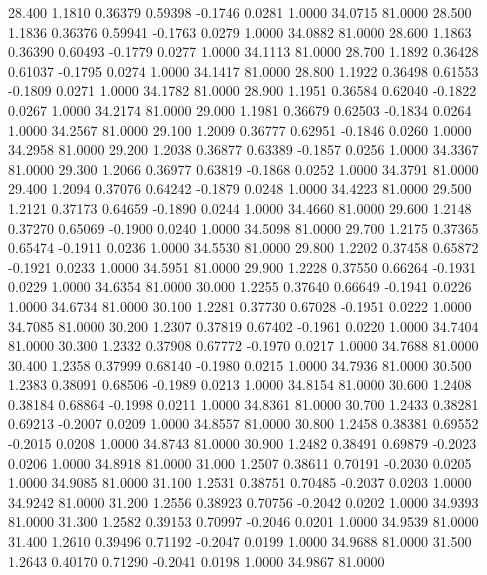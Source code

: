   28.400   1.1810   0.36379   0.59398  -0.1746   0.0281   1.0000  34.0715  81.0000
  28.500   1.1836   0.36376   0.59941  -0.1763   0.0279   1.0000  34.0882  81.0000
  28.600   1.1863   0.36390   0.60493  -0.1779   0.0277   1.0000  34.1113  81.0000
  28.700   1.1892   0.36428   0.61037  -0.1795   0.0274   1.0000  34.1417  81.0000
  28.800   1.1922   0.36498   0.61553  -0.1809   0.0271   1.0000  34.1782  81.0000
  28.900   1.1951   0.36584   0.62040  -0.1822   0.0267   1.0000  34.2174  81.0000
  29.000   1.1981   0.36679   0.62503  -0.1834   0.0264   1.0000  34.2567  81.0000
  29.100   1.2009   0.36777   0.62951  -0.1846   0.0260   1.0000  34.2958  81.0000
  29.200   1.2038   0.36877   0.63389  -0.1857   0.0256   1.0000  34.3367  81.0000
  29.300   1.2066   0.36977   0.63819  -0.1868   0.0252   1.0000  34.3791  81.0000
  29.400   1.2094   0.37076   0.64242  -0.1879   0.0248   1.0000  34.4223  81.0000
  29.500   1.2121   0.37173   0.64659  -0.1890   0.0244   1.0000  34.4660  81.0000
  29.600   1.2148   0.37270   0.65069  -0.1900   0.0240   1.0000  34.5098  81.0000
  29.700   1.2175   0.37365   0.65474  -0.1911   0.0236   1.0000  34.5530  81.0000
  29.800   1.2202   0.37458   0.65872  -0.1921   0.0233   1.0000  34.5951  81.0000
  29.900   1.2228   0.37550   0.66264  -0.1931   0.0229   1.0000  34.6354  81.0000
  30.000   1.2255   0.37640   0.66649  -0.1941   0.0226   1.0000  34.6734  81.0000
  30.100   1.2281   0.37730   0.67028  -0.1951   0.0222   1.0000  34.7085  81.0000
  30.200   1.2307   0.37819   0.67402  -0.1961   0.0220   1.0000  34.7404  81.0000
  30.300   1.2332   0.37908   0.67772  -0.1970   0.0217   1.0000  34.7688  81.0000
  30.400   1.2358   0.37999   0.68140  -0.1980   0.0215   1.0000  34.7936  81.0000
  30.500   1.2383   0.38091   0.68506  -0.1989   0.0213   1.0000  34.8154  81.0000
  30.600   1.2408   0.38184   0.68864  -0.1998   0.0211   1.0000  34.8361  81.0000
  30.700   1.2433   0.38281   0.69213  -0.2007   0.0209   1.0000  34.8557  81.0000
  30.800   1.2458   0.38381   0.69552  -0.2015   0.0208   1.0000  34.8743  81.0000
  30.900   1.2482   0.38491   0.69879  -0.2023   0.0206   1.0000  34.8918  81.0000
  31.000   1.2507   0.38611   0.70191  -0.2030   0.0205   1.0000  34.9085  81.0000
  31.100   1.2531   0.38751   0.70485  -0.2037   0.0203   1.0000  34.9242  81.0000
  31.200   1.2556   0.38923   0.70756  -0.2042   0.0202   1.0000  34.9393  81.0000
  31.300   1.2582   0.39153   0.70997  -0.2046   0.0201   1.0000  34.9539  81.0000
  31.400   1.2610   0.39496   0.71192  -0.2047   0.0199   1.0000  34.9688  81.0000
  31.500   1.2643   0.40170   0.71290  -0.2041   0.0198   1.0000  34.9867  81.0000
